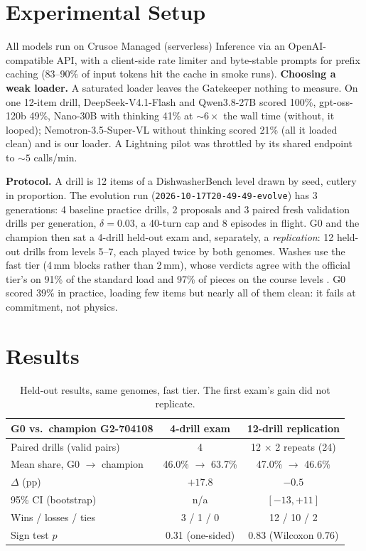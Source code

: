 \documentclass[9pt,twocolumn,letterpaper]{extarticle}
\newcommand{\Generations}{3}            %
\newcommand{\ProposalsPerGen}{2}
\newcommand{\PracticeTasks}{4}
\newcommand{\ValTasks}{3}
\newcommand{\Margin}{0.03}
\newcommand{\TurnCap}{40}
\newcommand{\RunId}{2026-10-17T20-49-49-evolve}
\newcommand{\BaselinePractice}{39\%}    %
\newcommand{\ChampionId}{G2-704108}
\begin{document}
\section{Experimental Setup}
All models run on Crusoe Managed (serverless) Inference via an OpenAI-compatible API, with a
client-side rate limiter and byte-stable prompts for prefix caching (83--90\% of input tokens hit
the cache in smoke runs). \textbf{Choosing a weak loader.} A saturated loader leaves the Gatekeeper
nothing to measure. On one 12-item drill, DeepSeek-V4.1-Flash and Qwen3.8-27B scored 100\%,
gpt-oss-120b 49\%, Nano-30B with thinking 41\% at ${\sim}6\times$ the wall time (without, it
looped); Nemotron-3.5-Super-VL without thinking scored 21\% (all it loaded clean) and is our
loader. A Lightning pilot was throttled by its shared endpoint to ${\sim}5$ calls/min.

\textbf{Protocol.} A drill is 12 items of a DishwasherBench level drawn by seed, cutlery in
proportion. The evolution run (\texttt{\RunId}) has \Generations{} generations: \PracticeTasks{}
baseline practice drills, \ProposalsPerGen{} proposals and \ValTasks{} paired fresh validation
drills per generation, $\delta=\Margin$, a \TurnCap-turn cap and 8 episodes in flight. G0 and the
champion then sat a 4-drill held-out exam and, separately, a \emph{replication}: 12 held-out drills
from levels 5--7, each played twice by both genomes. Washes use the fast tier (4\,mm blocks rather
than 2\,mm), whose verdicts agree with the official tier's on 91\% of the standard load and 97\%
of pieces on the course levels \citep{composo2026dishwasherbench}. G0 scored \BaselinePractice{}
in practice, loading few items but nearly all of them clean: it fails at commitment, not physics.

\section{Results}
\begin{table}[t]
\centering\footnotesize
\setlength{\tabcolsep}{3pt}
\begin{tabular}{@{}lcc@{}}
\toprule
G0 vs.\ champion \ChampionId & 4-drill exam & 12-drill replication \\
\midrule
Paired drills (valid pairs) & 4 & 12 $\times$ 2 repeats (24) \\
Mean share, G0 $\to$ champion & 46.0\% $\to$ 63.7\% & 47.0\% $\to$ 46.6\% \\
$\Delta$ (pp) & $+17.8$ & $-0.5$ \\
95\% CI (bootstrap) & n/a & $[-13, +11]$ \\
Wins / losses / ties & 3 / 1 / 0 & 12 / 10 / 2 \\
Sign test $p$ & 0.31 (one-sided) & 0.83 (Wilcoxon 0.76) \\
\bottomrule
\end{tabular}
\caption{Held-out results, same genomes, fast tier. The first exam's gain did not replicate.}
\label{tab:exam}
\end{table}
\end{document}
